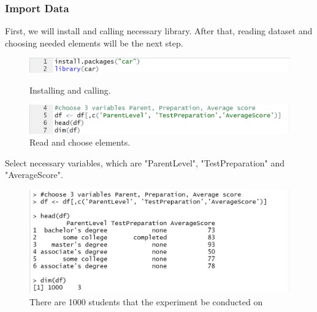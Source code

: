 \documentclass[a4paper]{article}
\begin{document}
\subsubsection{Import Data}
\vspace{0.4cm}
First, we will install and calling necessary library. After that, reading dataset and choosing needed elements will be the next step.
\begin{figure}[H]
    \centering
    \begin{minipage}{0.5\textwidth}
        \centering
        \includegraphics[width = 1.7\linewidth]{Images/Activity2/1.png}
        \caption{Installing and calling.}
        \label{fig:import1}
    \end{minipage}%
    \begin{minipage}{0.5\textwidth}
        \centering
        \includegraphics[width = 1\linewidth]{Images/Activity2/2.png}
        \caption{Read and choose elements.}
        \label{fig:import2}
    \end{minipage}
\end{figure}
Select necessary variables, which are "ParentLevel", "TestPreparation" and "AverageScore".
\begin{figure}[H]
    \centering 
    \includegraphics[scale = 0.7]{Images/Activity2/3.png}
    \caption{There are 1000 students that the experiment be conducted on}
    \label{fig:import3}
\end{figure}

\end{document}
